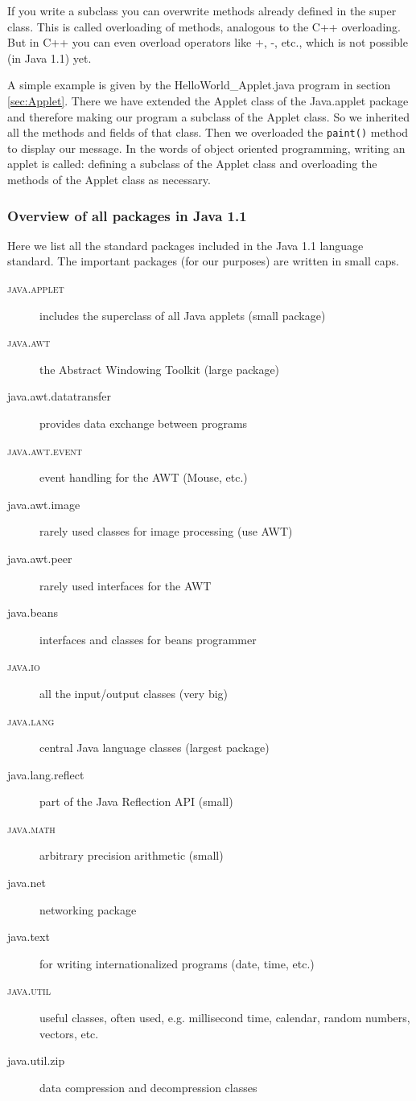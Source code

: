 If you write a subclass you can overwrite methods already defined
in the super class. This is called overloading of methods,
analogous to the C++ overloading. But in C++ you can even
overload operators like +, -, etc., which is not possible (in Java 1.1) yet.

A simple example is given by the
HelloWorld\_Applet.java program in section \ref{sec:Applet}.
There we have extended the Applet class of the Java.applet package
and therefore making our program a subclass of the Applet class.
So we inherited all the methods and fields of that class. Then we
overloaded the \verb|paint()| method to display our message. 
In the words of object oriented programming, writing an applet is
called: defining a subclass of the Applet class and overloading
the methods of the Applet class as necessary.

\subsubsection{Overview of all packages in Java 1.1}

Here we list all the standard packages included in the Java 1.1
language standard. The important packages (for our purposes)
are written in small caps.
\begin{description}
\item[\textsc{java.applet}] includes the superclass of all Java applets (small package)
\item[\textsc{java.awt}] the Abstract Windowing Toolkit (large package)
\item[java.awt.datatransfer] provides data exchange between programs
\item[\textsc{java.awt.event}] event handling for the AWT (Mouse, etc.)
\item[java.awt.image] rarely used classes for image processing (use AWT) 
\item[java.awt.peer] rarely used interfaces for the AWT
\item[java.beans] interfaces and classes for beans programmer
\item[\textsc{java.io}] all the input/output classes (very big)
\item[\textsc{java.lang}]  central Java language classes (largest package)
\item[java.lang.reflect] part of the Java Reflection API (small)
\item[\textsc{java.math}] arbitrary precision arithmetic (small)
\item[java.net] networking package
\item[java.text] for writing internationalized programs (date, time, etc.)
\item[\textsc{java.util}] useful classes, often used, e.g. millisecond time,
  calendar, random numbers, vectors, etc.
\item[java.util.zip] data compression and decompression classes
\end{description}

